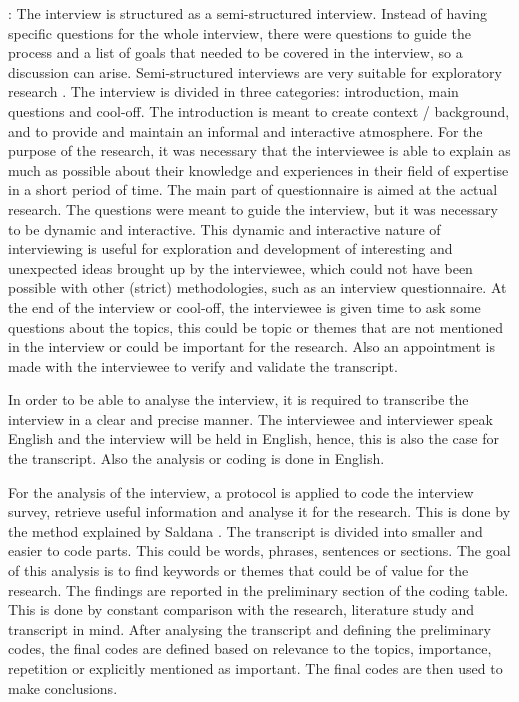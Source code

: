:  The interview is structured as a semi-structured interview. Instead of having specific questions for the whole interview, there were questions to guide the process and a list of goals that needed to be covered in the interview, so a discussion can arise. Semi-structured interviews are very suitable for exploratory research \cite{Runeson:2009:GCR:1519313.1519324}. The interview is divided in three categories: introduction, main questions and cool-off.
The introduction is meant to create context / background, and to provide and maintain an informal and interactive atmosphere. For the purpose of the research, it was necessary that the interviewee is able to explain as much as possible about their knowledge and experiences in their field of expertise in a short period of time. 
The main part of questionnaire is aimed at the actual research. The questions were meant to guide the interview, but it was necessary to be dynamic and interactive. This dynamic and interactive nature of interviewing is useful for exploration and development of interesting and unexpected ideas brought up by the interviewee, which could not have been possible with other (strict) methodologies, such as an interview questionnaire.
At the end of the interview or cool-off, the interviewee is given time to ask some questions about the topics, this could be topic or themes that are not mentioned in the interview or could be important for the research. Also an appointment is made with the interviewee to verify and validate the transcript.

 In order to be able to analyse the interview, it is required to transcribe the interview in a clear and precise manner. The interviewee and interviewer speak English and the interview will be held in English, hence, this is also the case for the transcript. Also the analysis or coding is done in English.

 For the analysis of the interview, a protocol is applied to code the interview survey, retrieve useful information and analyse it for the research. This is done by the method explained by Saldana \cite{saldana2015coding}. The transcript is divided into smaller and easier to code parts. This could be words, phrases, sentences or sections. The goal of this analysis is to find keywords or themes that could be of value for the research. The findings are reported in the preliminary section of the coding table. This is done by constant comparison with the research, literature study and transcript in mind. After analysing the transcript and defining the preliminary codes, the final codes are defined based on relevance to the topics, importance, repetition or explicitly mentioned as important. The final codes are then used to make conclusions.

